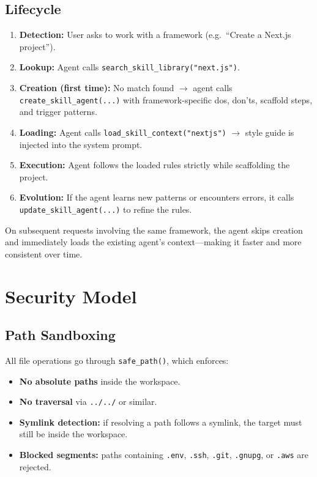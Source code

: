 \documentclass[11pt,a4paper]{article}
\begin{document}
\subsection{Lifecycle}

\begin{enumerate}[leftmargin=*]
  \item \textbf{Detection:} User asks to work with a framework (e.g.\ ``Create a Next.js project'').
  \item \textbf{Lookup:} Agent calls \texttt{search\_skill\_library("next.js")}.
  \item \textbf{Creation (first time):} No match found $\to$ agent calls \texttt{create\_skill\_agent(...)} with framework-specific dos, don'ts, scaffold steps, and trigger patterns.
  \item \textbf{Loading:} Agent calls \texttt{load\_skill\_context("nextjs")} $\to$ style guide is injected into the system prompt.
  \item \textbf{Execution:} Agent follows the loaded rules strictly while scaffolding the project.
  \item \textbf{Evolution:} If the agent learns new patterns or encounters errors, it calls \texttt{update\_skill\_agent(...)} to refine the rules.
\end{enumerate}

\begin{tipbox}
On subsequent requests involving the same framework, the agent skips creation and immediately loads the existing agent's context---making it faster and more consistent over time.
\end{tipbox}

\section{Security Model}

\subsection{Path Sandboxing}

All file operations go through \texttt{safe\_path()}, which enforces:

\begin{itemize}[leftmargin=*]
  \item \textbf{No absolute paths} inside the workspace.
  \item \textbf{No traversal} via \texttt{../../} or similar.
  \item \textbf{Symlink detection:} if resolving a path follows a symlink, the target must still be inside the workspace.
  \item \textbf{Blocked segments:} paths containing \texttt{.env}, \texttt{.ssh}, \texttt{.git}, \texttt{.gnupg}, or \texttt{.aws} are rejected.
\end{itemize}
\end{document}
